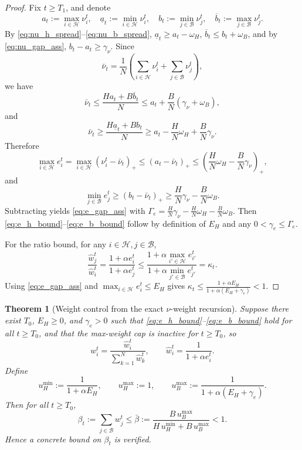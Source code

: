 \documentclass[11pt,a4paper]{article}
\newtheorem{theorem}{Theorem}
\theoremstyle{remark}
\newcommand{\HH}{\mathcal{H}}
\newcommand{\BB}{\mathcal{B}}
\begin{document}
\begin{proof}
Fix \(t\ge T_1\), and denote
\[
    a_t:=\max_{i\in\HH}\nu_i^t,\quad
    \underline a_t:=\min_{i\in\HH}\nu_i^t,\quad
    b_t:=\min_{j\in\BB}\nu_j^t,\quad
    \overline b_t:=\max_{j\in\BB}\nu_j^t.
\]
By \eqref{eq:nu_h_spread}--\eqref{eq:nu_b_spread},
\(\underline a_t\ge a_t-\omega_H\), \(\overline b_t\le b_t+\omega_B\), and by
\eqref{eq:nu_gap_ass}, \(b_t-a_t\ge\gamma_\nu\).
Since
\[
    \bar\nu_t
    =
    \frac{1}{N}\!\left(\sum_{i\in\HH}\nu_i^t+\sum_{j\in\BB}\nu_j^t\right),
\]
we have
\[
    \bar\nu_t
    \le
    \frac{H a_t + B\overline b_t}{N}
    \le
    a_t + \frac{B}{N}(\gamma_\nu+\omega_B),
\]
and
\[
    \bar\nu_t
    \ge
    \frac{H\underline a_t + B b_t}{N}
    \ge
    a_t - \frac{H}{N}\omega_H + \frac{B}{N}\gamma_\nu.
\]
Therefore
\[
    \max_{i\in\HH} e_i^t
    =
    \max_{i\in\HH}(\nu_i^t-\bar\nu_t)_+
    \le
    (a_t-\bar\nu_t)_+
    \le
    \left(\frac{H}{N}\omega_H-\frac{B}{N}\gamma_\nu\right)_+,
\]
and
\[
    \min_{j\in\BB} e_j^t
    \ge
    (b_t-\bar\nu_t)_+
    \ge
    \frac{H}{N}\gamma_\nu-\frac{B}{N}\omega_B.
\]
Subtracting yields \eqref{eq:e_gap_ass} with
\(\Gamma_e=\frac{H}{N}\gamma_\nu-\frac{H}{N}\omega_H-\frac{B}{N}\omega_B\).
Then \eqref{eq:e_h_bound}--\eqref{eq:e_b_bound} follow by definition of
\(E_H\) and any \(0<\gamma_e\le\Gamma_e\).

For the ratio bound,
for any \(i\in\HH, j\in\BB\),
\[
    \frac{\hat w_j^t}{\hat w_i^t}
    =
    \frac{1+\alpha e_i^t}{1+\alpha e_j^t}
    \le
    \frac{1+\alpha \max_{i'\in\HH}e_{i'}^t}
         {1+\alpha \min_{j'\in\BB}e_{j'}^t}
    =\kappa_t.
\]
Using \eqref{eq:e_gap_ass} and \(\max_{i\in\HH}e_i^t\le E_H\) gives
\(\kappa_t\le\frac{1+\alpha E_H}{1+\alpha(E_H+\gamma_e)}<1\).
\end{proof}

\begin{theorem}[Weight control from the exact \(\nu\)-weight recursion]
\label{thm:weight_control_exact}
Suppose there exist \(T_0\), \(E_H\ge 0\), and \(\gamma_e>0\) such that
\eqref{eq:e_h_bound}--\eqref{eq:e_b_bound} hold for all \(t\ge T_0\), and that
the max-weight cap is inactive for \(t\ge T_0\), so
\begin{equation}
    w_i^t = \frac{\hat w_i^t}{\sum_{k=1}^N \hat w_k^t},
    \qquad
    \hat w_i^t = \frac{1}{1+\alpha e_i^t}.
    \label{eq:exact_weight_no_cap}
\end{equation}
Define
\[
    u_H^{\min} := \frac{1}{1+\alpha E_H},
    \qquad
    u_H^{\max} := 1,
    \qquad
    u_B^{\max} := \frac{1}{1+\alpha(E_H+\gamma_e)}.
\]
Then for all \(t\ge T_0\),
\begin{equation}
    \beta_t
    :=
    \sum_{j\in\BB} w_j^t
    \le
    \bar\beta
    :=
    \frac{B\,u_B^{\max}}{H\,u_H^{\min}+B\,u_B^{\max}}
    < 1.
    \label{eq:beta_bar_exact}
\end{equation}
Hence a concrete bound on \(\beta_t\) is verified.
\end{theorem}
\end{document}
